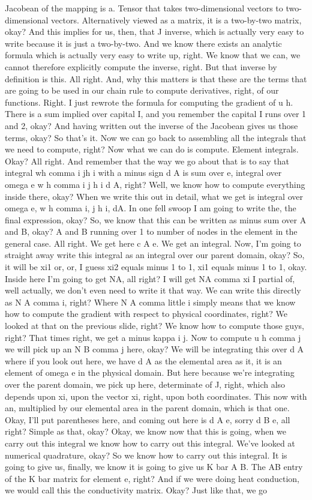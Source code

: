 \documentclass[10pt]{article}
\begin{document}
Jacobean of the mapping is a. Tensor that takes two-dimensional vectors to two-dimensional vectors. Alternatively viewed as a matrix, it is a two-by-two matrix, okay? And this implies for us, then, that J inverse, which is actually very easy to write because it is just a two-by-two. And we know there exists an analytic formula which is actually very easy to write up, right. We know that we can, we cannot therefore explicitly compute the inverse, right. But that inverse by definition is this. All right. And, why this matters is that these are the terms that are going to be used in our chain rule to compute derivatives, right, of our functions. Right. I just rewrote the formula for computing the gradient of u h. There is a sum implied over capital I, and you remember the capital I runs over 1 and 2, okay? And having written out the inverse of the Jacobean gives us those terms, okay? So that's it. Now we can go back to assembling all the integrals that we need to compute, right? Now what we can do is compute. Element integrals. Okay? All right. And remember that the way we go about that is to say that integral wh comma i jh i with a minus sign d A is sum over e, integral over omega e w h comma i j h i d A, right? Well, we know how to compute everything inside there, okay? When we write this out in detail, what we get is integral over omega e, w h comma i, j h i, dA. In one fell swoop I am going to write the, the final expression, okay? So, we know that this can be written as minus sum over A and B, okay? A and B running over 1 to number of nodes in the element in the general case. All right. We get here c A e. We get an integral. Now, I'm going to straight away write this integral as an integral over our parent domain, okay? So, it will be xi1 or, or, I guess xi2 equals minus 1 to 1, xi1 equals minus 1 to 1, okay. Inside here I'm going to get NA, all right? I will get NA comma xi I partial of, well actually, we don't even need to write it that way. We can write this directly as N A comma i, right? Where N A comma little i simply means that we know how to compute the gradient with respect to physical coordinates, right? We looked at that on the previous slide, right? We know how to compute those guys, right? That times right, we get a minus kappa i j. Now to compute u h comma j we will pick up an N B comma j here, okay? We will be integrating this over d A where if you look out here, we have d A as the elemental area as it, it is an element of omega e in the physical domain. But here because we're integrating over the parent domain, we pick up here, determinate of J, right, which also depends upon xi, upon the vector xi, right, upon both coordinates. This now with an, multiplied by our elemental area in the parent domain, which is that one. Okay, I'll put parentheses here, and coming out here is d A e, sorry d B e, all right?  Simple as that, okay? Okay, we know now that this is going, when we carry out this integral we know how to carry out this integral. We've looked at numerical quadrature, okay? So we know how to carry out this integral. It is going to give us, finally, we know it is going to give us K bar A B. The AB entry of the K bar matrix for element e, right? And if we were doing heat conduction, we would call this the conductivity matrix. Okay? Just like that, we go 
\end{document}
